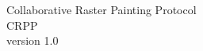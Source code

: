 \documentclass[12pt,oneside,a4paper]{report}
\begin{document}
\thispagestyle{empty}
\begin{center}

{\Huge Collaborative Raster Painting Protocol}\\[50pt]

{\Huge CRPP}\\[100pt]

{\Large version 1.0}

\end{center}
\newpage

\tableofcontents
\newpage




%
%
%
%
%
\end{document}
